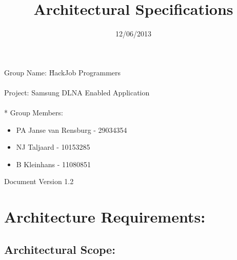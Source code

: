 \documentclass[12pt]{article}
\title{Architectural Specifications}
\date{12/06/2013}
\begin{document}
  \maketitle
\begin{tabbing}
Group Name: \= HackJob Programmers
\\~
\\Project: Samsung DLNA Enabled Application
\\~
  \\* Group Members:
\end{tabbing}
	
	\begin{itemize}
	\item PA Janse van Rensburg - 29034354
	\item NJ Taljaard - 10153285
	\item B Kleinhans - 11080851
	\end{itemize}

Document Version 1.2

\newpage
\section{Architecture Requirements:}
\subsection{Architectural Scope:}
\end{document}

